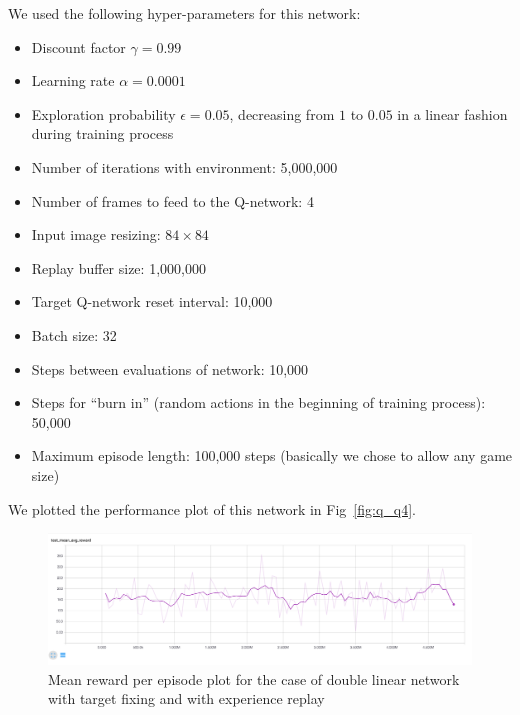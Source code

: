 \documentclass{article}
\begin{document}
We used the following hyper-parameters for this network:
\begin{itemize}
  \item Discount factor $\gamma=0.99$
  \item Learning rate $\alpha=0.0001$
  \item Exploration probability $\epsilon=0.05$, decreasing from $1$ to $0.05$ in a linear fashion during training process
  \item Number of iterations with environment: 5,000,000
  \item Number of frames to feed to the Q-network: 4
  \item Input image resizing: $84\times84$
  \item Replay buffer size: 1,000,000
  \item Target Q-network reset interval: 10,000
  \item Batch size: 32
  \item Steps between evaluations of network: 10,000
  \item Steps for ``burn in'' (random actions in the beginning of training process): 50,000
  \item Maximum episode length: 100,000 steps (basically we chose to allow any game size)
\end{itemize}

We plotted the performance plot of this network in Fig~\ref{fig:q_q4}.


\begin{figure}[h]
  \label{fig:r_q4} 
  \centering
  \includegraphics[width=1.0\textwidth]{images/r_q4}
  \caption{Mean reward per episode plot for the case of double linear network with target fixing and with experience replay}
\end{figure}
\end{document}
